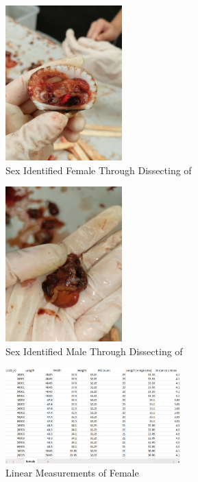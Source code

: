 \begin{figure}[!htbp]
	\centering
	\includegraphics[width=0.4\textwidth, angle=90]{figures/dissecting_female.jpg}
	\caption{Sex Identified Female Through Dissecting of \Tegillarcagranosa}
\end{figure}

\begin{figure}[!htbp]
	\centering
	\includegraphics[width=0.4\textwidth, angle=90]{figures/dissecting male.jpg}
	\caption{Sex Identified Male Through Dissecting of \Tegillarcagranosa}
\end{figure}

\begin{figure}[!htbp]
	\centering
	\includegraphics[width=0.6\textwidth]{figures/female_dataset.png}
	\caption{Linear Measurements of Female \Tegillarcagranosa}
\end{figure}

